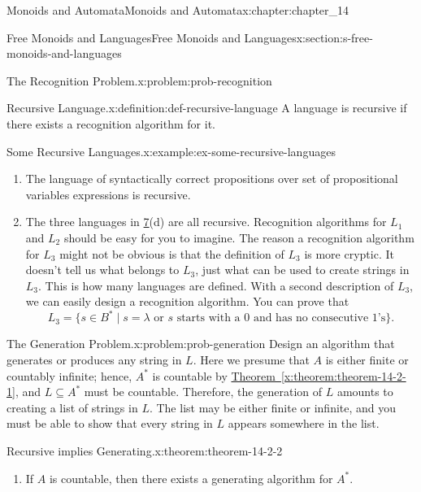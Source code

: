 \documentclass[oneside,10pt,]{book}
\newcommand{\xreffont}{\relax}
\numberwithin{equation}{section}
\begin{document}
\begin{chapterptx}{Monoids and Automata}{}{Monoids and Automata}{}{}{x:chapter:chapter_14}
\begin{sectionptx}{Free Monoids and Languages}{}{Free Monoids and Languages}{}{}{x:section:s-free-monoids-and-languages}
\begin{problem}{The Recognition Problem.}{x:problem:prob-recognition}
\end{problem}
\begin{definition}{Recursive Language.}{x:definition:def-recursive-language}%
%
A language is recursive if there exists a recognition algorithm for it.%
\end{definition}
\begin{example}{Some Recursive Languages.}{x:example:ex-some-recursive-languages}%
%
\begin{enumerate}[label=(\alph*)]
\item{}The language of syntactically correct propositions over set of propositional variables expressions is recursive.%
\item{}The three languages in \hyperref[x:example:ex-some-formal-languages]{7}(d)  are all recursive. Recognition algorithms for \(L_1\) and \(L_2\) should be easy for you to imagine.  The reason a recognition algorithm for \(L_3\) might not be obvious is that the definition of \(L_3\)  is more cryptic. It doesn't tell us what belongs to \(L_3\), just what can be used to create strings in \(L_3\). This is how many languages are defined. With a second description of \(L_3\), we can easily design a recognition algorithm. You can prove that%
\begin{equation*}
L_3=\{s\in B^* \mid s=\lambda  \textrm{ or }  s \textrm{ starts with a 0 and has no consecutive 1's}\}\text{.}
\end{equation*}
%
\end{enumerate}
%
\end{example}
\begin{problem}{The Generation Problem.}{x:problem:prob-generation}%
Design an algorithm that generates or produces any string in \(L\). Here we presume that \(A\) is either finite or countably infinite; hence, \(A^*\)  is countable by \hyperref[x:theorem:theorem-14-2-1]{Theorem~{\xreffont\ref{x:theorem:theorem-14-2-1}}}, and \(L \subseteq A^*\) must be countable. Therefore, the generation of \(L\) amounts to creating a list of strings in \(L\). The list may be either finite or infinite, and you must be able to show that every string in \(L\) appears somewhere in the list.%
\end{problem}
\begin{theorem}{Recursive implies Generating.}{}{x:theorem:theorem-14-2-2}%
%
\begin{enumerate}[label=(\alph*)]
\item{}If \(A\) is countable, then there exists a generating algorithm for \(A^*\).%

\end{enumerate}
\end{theorem}
\end{sectionptx}
\end{chapterptx}
\end{document}
